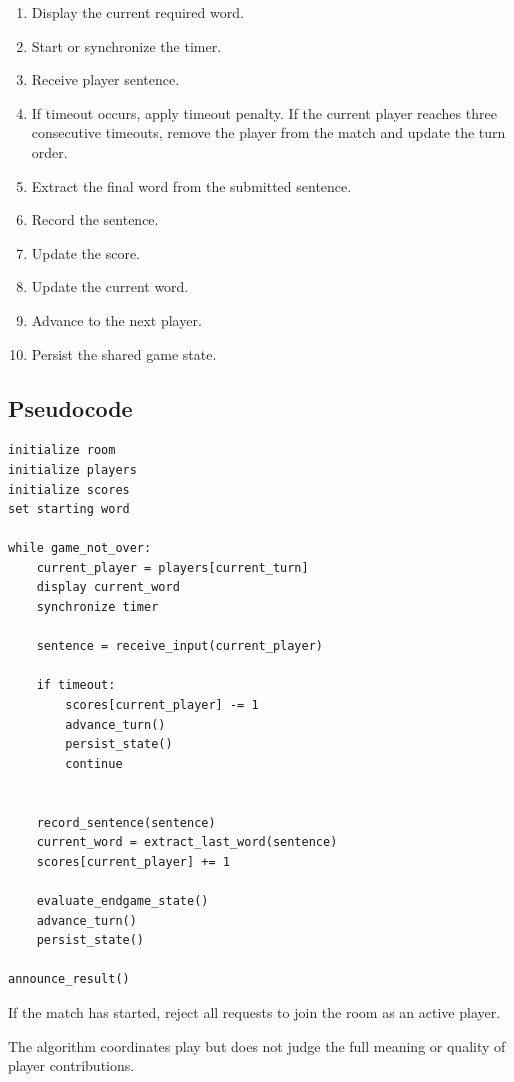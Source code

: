\documentclass[11pt,a4paper]{article}
\begin{document}
\begin{enumerate}
    \item Display the current required word.
    \item Start or synchronize the timer.
    \item Receive player sentence.
    \item If timeout occurs, apply timeout penalty. If the current player reaches three consecutive timeouts, remove the player from the match and update the turn order.
    
    \item Extract the final word from the submitted sentence.
    \item Record the sentence.
    \item Update the score.
    \item Update the current word.
    \item Advance to the next player.
    \item Persist the shared game state.
\end{enumerate}



\subsection{Pseudocode}

\begin{verbatim}
initialize room
initialize players
initialize scores
set starting word

while game_not_over:
    current_player = players[current_turn]
    display current_word
    synchronize timer

    sentence = receive_input(current_player)

    if timeout:
        scores[current_player] -= 1
        advance_turn()
        persist_state()
        continue

    
    record_sentence(sentence)
    current_word = extract_last_word(sentence)
    scores[current_player] += 1

    evaluate_endgame_state()
    advance_turn()
    persist_state()

announce_result()
\end{verbatim}

If the match has started,
reject all requests to join the room as an active player.

The algorithm coordinates play but does not judge the full meaning or quality of player contributions.
\end{document}
